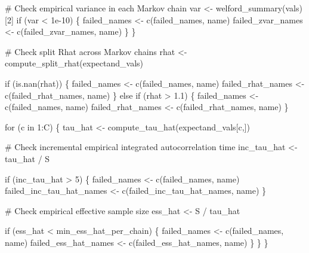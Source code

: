 \documentclass[
  letterpaper,
  DIV=11,
  numbers=noendperiod]{scrartcl}
\newenvironment{Shaded}{\begin{snugshade}}{\end{snugshade}}
\newcommand{\CommentTok}[1]{\textcolor[rgb]{0.37,0.37,0.37}{#1}}
\newcommand{\ControlFlowTok}[1]{\textcolor[rgb]{0.00,0.23,0.31}{#1}}
\newcommand{\DecValTok}[1]{\textcolor[rgb]{0.68,0.00,0.00}{#1}}
\newcommand{\FloatTok}[1]{\textcolor[rgb]{0.68,0.00,0.00}{#1}}
\newcommand{\KeywordTok}[1]{\textcolor[rgb]{0.00,0.23,0.31}{#1}}
\newcommand{\NormalTok}[1]{\textcolor[rgb]{0.00,0.23,0.31}{#1}}
\newcommand{\OperatorTok}[1]{\textcolor[rgb]{0.37,0.37,0.37}{#1}}
\begin{document}
\begin{Shaded}
\begin{Highlighting}[]
      \CommentTok{\# Check empirical variance in each Markov chain}
\NormalTok{      var }\OperatorTok{\textless{}{-}}\NormalTok{ welford\_summary(vals)[}\DecValTok{2}\NormalTok{]}
      \ControlFlowTok{if}\NormalTok{ (var }\OperatorTok{\textless{}} \FloatTok{1e{-}10}\NormalTok{) \{}
\NormalTok{        failed\_names }\OperatorTok{\textless{}{-}}\NormalTok{ c(failed\_names, name)}
\NormalTok{        failed\_zvar\_names }\OperatorTok{\textless{}{-}}\NormalTok{ c(failed\_zvar\_names, name) }
\NormalTok{      \}}
\NormalTok{    \}}

    \CommentTok{\# Check split Rhat across Markov chains}
\NormalTok{    rhat }\OperatorTok{\textless{}{-}}\NormalTok{ compute\_split\_rhat(expectand\_vals)}

    \ControlFlowTok{if}\NormalTok{ (}\KeywordTok{is}\NormalTok{.nan(rhat)) \{}
\NormalTok{      failed\_names }\OperatorTok{\textless{}{-}}\NormalTok{ c(failed\_names, name)}
\NormalTok{      failed\_rhat\_names }\OperatorTok{\textless{}{-}}\NormalTok{ c(failed\_rhat\_names, name)}
\NormalTok{    \} }\ControlFlowTok{else} \ControlFlowTok{if}\NormalTok{ (rhat }\OperatorTok{\textgreater{}} \FloatTok{1.1}\NormalTok{) \{}
\NormalTok{      failed\_names }\OperatorTok{\textless{}{-}}\NormalTok{ c(failed\_names, name)}
\NormalTok{      failed\_rhat\_names }\OperatorTok{\textless{}{-}}\NormalTok{ c(failed\_rhat\_names, name)}
\NormalTok{    \}}

    \ControlFlowTok{for}\NormalTok{ (c }\KeywordTok{in} \DecValTok{1}\NormalTok{:C) \{}
\NormalTok{      tau\_hat }\OperatorTok{\textless{}{-}}\NormalTok{ compute\_tau\_hat(expectand\_vals[c,])}

      \CommentTok{\# Check incremental empirical integrated autocorrelation time}
\NormalTok{      inc\_tau\_hat }\OperatorTok{\textless{}{-}}\NormalTok{ tau\_hat }\OperatorTok{/}\NormalTok{ S}

      \ControlFlowTok{if}\NormalTok{ (inc\_tau\_hat }\OperatorTok{\textgreater{}} \DecValTok{5}\NormalTok{) \{}
\NormalTok{        failed\_names }\OperatorTok{\textless{}{-}}\NormalTok{ c(failed\_names, name)}
\NormalTok{        failed\_inc\_tau\_hat\_names }\OperatorTok{\textless{}{-}}\NormalTok{ c(failed\_inc\_tau\_hat\_names, name)}
\NormalTok{      \}}

      \CommentTok{\# Check empirical effective sample size}
\NormalTok{      ess\_hat }\OperatorTok{\textless{}{-}}\NormalTok{ S }\OperatorTok{/}\NormalTok{ tau\_hat}
      
      \ControlFlowTok{if}\NormalTok{ (ess\_hat }\OperatorTok{\textless{}}\NormalTok{ min\_ess\_hat\_per\_chain) \{}
\NormalTok{        failed\_names }\OperatorTok{\textless{}{-}}\NormalTok{ c(failed\_names, name)}
\NormalTok{        failed\_ess\_hat\_names }\OperatorTok{\textless{}{-}}\NormalTok{ c(failed\_ess\_hat\_names, name)}
\NormalTok{      \}}
\NormalTok{    \}}
\NormalTok{  \}}
  

\end{Highlighting}
\end{Shaded}
\end{document}
